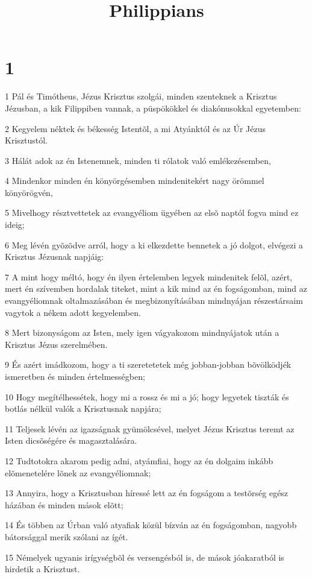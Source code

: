 

\title{Philippians}


\chapter{1}

\par 1 Pál és Timótheus, Jézus Krisztus szolgái, minden szenteknek a Krisztus Jézusban, a kik Filippiben vannak, a püspökökkel és diakónusokkal egyetemben:
\par 2 Kegyelem néktek és békesség Istentõl, a mi Atyánktól és az Úr Jézus Krisztustól.
\par 3 Hálát adok az én Istenemnek, minden ti rólatok való emlékezésemben,
\par 4 Mindenkor minden én könyörgésemben mindenitekért nagy örömmel könyörögvén,
\par 5 Mivelhogy résztvettetek az evangyéliom ügyében az elsõ naptól fogva mind ez ideig;
\par 6 Meg lévén gyõzõdve arról, hogy a ki elkezdette bennetek a jó dolgot, elvégezi a Krisztus Jézusnak napjáig:
\par 7 A mint hogy méltó, hogy én ilyen értelemben legyek mindenitek felõl, azért, mert én szívemben hordalak titeket, mint a kik mind az én fogságomban, mind az evangyéliomnak oltalmazásában és megbizonyításában mindnyájan részestársaim vagytok a nékem adott kegyelemben.
\par 8 Mert bizonyságom az Isten, mely igen vágyakozom mindnyájatok után a Krisztus Jézus szerelmében.
\par 9 És azért imádkozom, hogy a ti szeretetetek még jobban-jobban bõvölködjék ismeretben és minden értelmességben;
\par 10 Hogy megítélhessétek, hogy mi a rossz és mi a jó; hogy legyetek tiszták és botlás nélkül valók a Krisztusnak napjára;
\par 11 Teljesek lévén az igazságnak gyümölcsével, melyet Jézus Krisztus teremt az Isten dicsõségére és magasztalására.
\par 12 Tudtotokra akarom pedig adni, atyámfiai, hogy az én dolgaim inkább elõmenetelére lõnek az evangyéliomnak;
\par 13 Annyira, hogy a Krisztusban híressé lett az én fogságom a testõrség egész házában és minden mások elõtt;
\par 14 És többen az Úrban való atyafiak közül bízván az én fogságomban, nagyobb bátorsággal merik szólani az ígét.
\par 15 Némelyek ugyanis irígységbõl és versengésból is, de mások jóakaratból is hirdetik a Krisztust.
